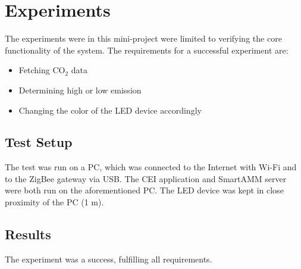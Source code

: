 \documentclass[Main]{subfiles}
\begin{document}
\section{Experiments} %
\label{sec:experiments} 
	The experiments were in this mini-project were limited to verifying the core functionality of the system. 
	The requirements for a successful experiment are:

	\begin{itemize}
		\item Fetching CO$_2$ data
		\item Determining high or low emission
		\item Changing the color of the LED device accordingly
	\end{itemize}

	\subsection{Test Setup} %
		The test was run on a PC, which was connected to the Internet with Wi-Fi and to the ZigBee gateway via USB.  
		The CEI application and SmartAMM server were both run on the aforementioned PC.
		The LED device was kept in close proximity of the PC (1 m).
	\label{sub:test_setup}

	\subsection{Results} %
	\label{sub:results}
		The experiment was a success, fulfilling all requirements. 
	
	
	 


\end{document}
